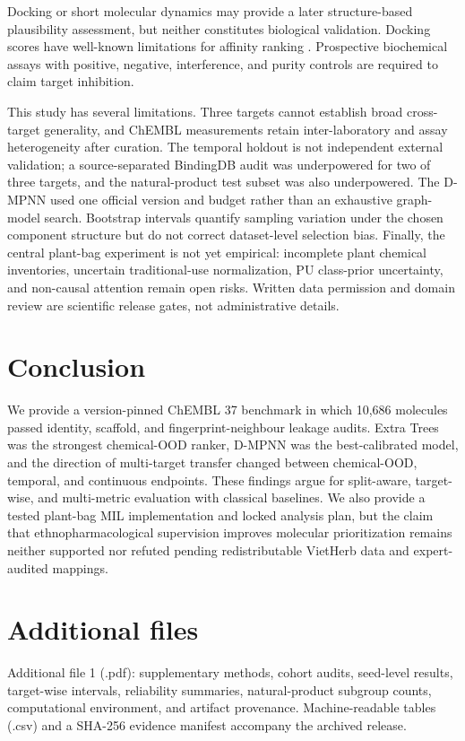 \documentclass[11pt]{article}
\begin{document}
Docking or short molecular dynamics may provide a later structure-based
plausibility assessment, but neither constitutes biological validation.
Docking scores have well-known limitations for affinity ranking
\citep{warren2006docking}. Prospective biochemical assays with positive,
negative, interference, and purity controls are required to claim target
inhibition.

This study has several limitations. Three targets cannot establish broad
cross-target generality, and ChEMBL measurements retain inter-laboratory and
assay heterogeneity after curation. The temporal holdout is not independent
external validation; a source-separated BindingDB audit was underpowered for
two of three targets, and the natural-product test subset was also underpowered. The
D-MPNN used one official version and budget rather than an exhaustive graph-model
search. Bootstrap intervals quantify sampling variation under the chosen
component structure but do not correct dataset-level selection bias. Finally,
the central plant-bag experiment is not yet empirical: incomplete plant chemical
inventories, uncertain traditional-use normalization, PU class-prior
uncertainty, and non-causal attention remain open risks. Written data permission
and domain review are scientific release gates, not administrative details.

\section{Conclusion}

We provide a version-pinned ChEMBL 37 benchmark in which 10,686 molecules passed
identity, scaffold, and fingerprint-neighbour leakage audits. Extra Trees was
the strongest chemical-OOD ranker, D-MPNN was the best-calibrated model, and the
direction of multi-target transfer changed between chemical-OOD, temporal, and
continuous endpoints. These findings argue for split-aware, target-wise, and
multi-metric evaluation with classical baselines. We also provide a tested
plant-bag MIL implementation and locked analysis plan, but the claim that
ethnopharmacological supervision improves molecular prioritization remains
neither supported nor refuted pending redistributable VietHerb data and
expert-audited mappings.

\section*{Additional files}

Additional file 1 (.pdf): supplementary methods, cohort audits, seed-level
results, target-wise intervals, reliability summaries, natural-product subgroup
counts, computational environment, and artifact provenance. Machine-readable
tables (.csv) and a SHA-256 evidence manifest accompany the archived release.
\end{document}
